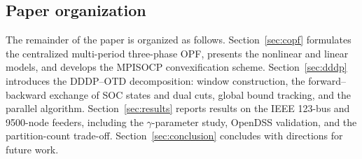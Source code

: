 \subsection*{Paper organization}

The remainder of the paper is organized as follows.
Section~\ref{sec:copf} formulates the centralized multi-period three-phase OPF,
presents the nonlinear and linear models, and develops the MPISOCP convexification
scheme. Section~\ref{sec:dddp} introduces the DDDP--OTD decomposition: window
construction, the forward–backward exchange of SOC states and dual cuts, global
bound tracking, and the parallel algorithm.
Section~\ref{sec:results} reports results on the IEEE 123-bus and 9500-node
feeders, including the $\gamma$-parameter study, OpenDSS validation, and the
partition-count trade-off.
Section~\ref{sec:conclusion} concludes with directions for future work.
